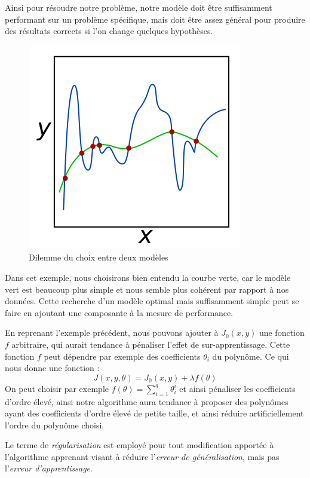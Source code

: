 \documentclass[a4paper, 10pt]{report}
\begin{document}
Ainsi pour résoudre notre problème, notre modèle doit être suffisamment performant sur un problème spécifique, mais doit être assez général pour produire des résultats corrects si l'on change quelques hypothèses.
\begin{figure}[H]
	\begin{center}
		\includegraphics[scale=0.5]{Images/Regularization.png}
		\caption{Dilemme du choix entre deux modèles}
	\end{center}
\end{figure}
Dans cet exemple, nous choisirons bien entendu la courbe verte, car le modèle vert est beaucoup plus simple et nous semble plus cohérent par rapport à nos données.
Cette recherche d'un modèle optimal mais suffisamment simple peut se faire en ajoutant une composante à la mesure de performance.

En reprenant l'exemple précédent, nous pouvons ajouter à $J_0(x,y)$ une fonction $f$ arbitraire, qui aurait tendance à pénaliser l'effet de sur-apprentissage.
Cette fonction $f$ peut dépendre par exemple des coefficients $\theta_i$ du polynôme.
Ce qui nous donne une fonction :
$$J(x,y,\theta) = J_0(x,y) + \lambda f(\theta)$$
On peut choisir par exemple $f(\theta) = \sum_{i=1}^{q}{\theta_i^i}$ et ainsi pénaliser les coefficients d'ordre élevé, ainsi notre algorithme aura tendance à proposer des polynômes ayant des coefficients d'ordre élevé de petite taille, et ainsi réduire artificiellement l'ordre du polynôme choisi.

Le terme de \emph{régularisation} est employé pour tout modification apportée à l'algorithme apprenant visant à réduire l'\emph{erreur de généralisation}, mais pas l'\emph{erreur d'apprentissage}.
	
\end{document}
